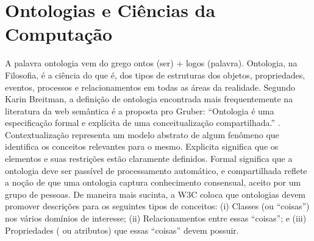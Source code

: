 \section{Ontologias e Ciências da Computação}

A palavra ontologia vem do grego ontos (ser) + logos (palavra). Ontologia, na Filosofia, é a ciência do que é, dos tipos de estruturas dos objetos, propriedades, eventos, processos e relacionamentos em todas as áreas da realidade. Segundo Karin Breitman, a definição de ontologia encontrada mais frequentemente na literatura da web semântica é a proposta pro Gruber: “Ontologia é uma especificação formal e explícita de uma conceitualização compartilhada.” . Contextualização representa um modelo abstrato de algum fenômeno que identifica os conceitos relevantes para o mesmo. Explicita significa que os elementos e suas restrições estão claramente definidos. Formal significa que a ontologia deve ser passível de processamento automático, e compartilhada reflete a noção de que uma ontologia captura conhecimento consensual, aceito por um grupo de pessoas. De maneira mais sucinta, a W3C coloca que ontologias devem promover descrições para os seguintes tipos de conceitos: (i) Classes (ou “coisas”) nos vários domínios de interesse; (ii) Relacionamentos entre essas “coisas”; e (iii) Propriedades ( ou atributos) que essas “coisas” devem possuir. 